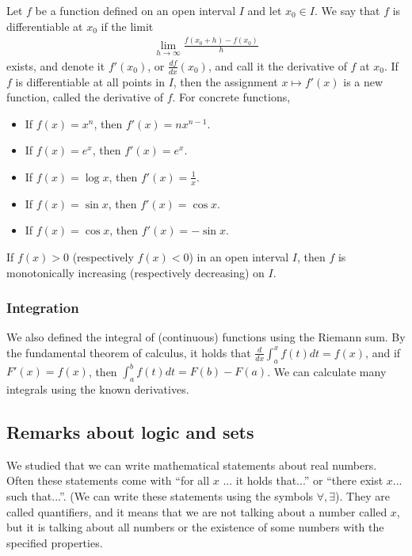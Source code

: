 Let $f$ be a function defined on an open interval $I$ and let $x_0 \in I$.
We say that $f$ is differentiable at $x_0$ if the limit
\begin{align*}
 \lim_{h\to \infty} \frac{f(x_0 + h) - f(x_0)}h
\end{align*}
exists, and denote it $f'(x_0)$, or $\frac{df}{dx}(x_0)$, and call it the derivative of $f$ at $x_0$.
If $f$ is differentiable at all points in $I$, then the assignment $x \mapsto f'(x)$ is a new function,
called the derivative of $f$. For concrete functions,
\begin{itemize}
 \item If $f(x) = x^n$, then $f'(x) = nx^{n-1}$.
 \item If $f(x) = e^x$, then $f'(x) = e^x$.
 \item If $f(x) = \log x$, then $f'(x) = \frac1x$.
 \item If $f(x) = \sin x$, then $f'(x) = \cos x$.
 \item If $f(x) = \cos x$, then $f'(x) = -\sin x$.
\end{itemize}
If $f(x) > 0$ (respectively $f(x) < 0$) in an open interval $I$, then $f$ is monotonically increasing (respectively decreasing) on $I$.

\subsubsection*{Integration}

We also defined the integral of (continuous) functions using the Riemann sum.
By the fundamental theorem of calculus, it holds that 
$\frac{d}{dx}\int_a^x f(t)dt = f(x)$, and if $F'(x) = f(x)$, then $\int_a^b f(t)dt = F(b)-F(a)$.
We can calculate many integrals using the known derivatives.

\subsection*{Remarks about logic and sets}
We studied that we can write mathematical statements about real numbers.
Often these statements come with ``for all $x$ ... it holds that...'' or ``there exist $x$... such that...''.
(We can write these statements using the symbols $\forall, \exists$).
They are called quantifiers, and it means that we are not talking about a number called $x$, but it is talking about
all numbers or the existence of some numbers with the specified properties.

